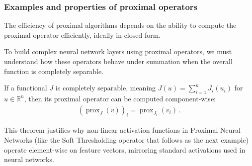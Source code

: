 \subsubsection{Examples and properties of proximal operators}
The efficiency of proximal algorithms depends on the ability to compute the proximal operator efficiently, ideally in closed form.

To build complex neural network layers using proximal operators, we must understand how these operators behave under summation when the overall function is completely separable.

\begin{thm}\label{thm:prox_separable}\normalfont
If a functional $J$ is completely separable, meaning $J(u) = \sum_{i=1}^n J_i(u_i)$ for $u \in \mathbb{R}^n$, then its proximal operator can be computed component-wise:
\begin{align*}
(\operatorname{prox}_{J}(v))_i = \operatorname{prox}_{J_i}(v_i) \, .
\end{align*}
\end{thm}
This theorem justifies why non-linear activation functions in Proximal Neural Networks (like the Soft Thresholding operator that follows as the next example) operate element-wise on feature vectors, mirroring standard activations used in neural networks.

